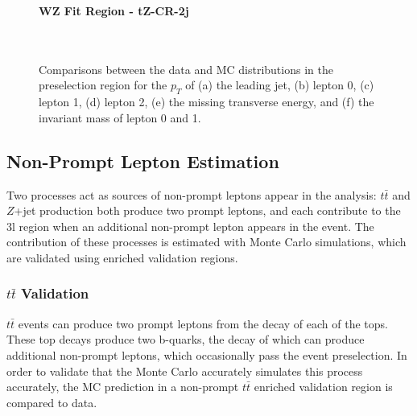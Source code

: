 \begin{figure}[H]
    \textbf{WZ Fit Region - tZ-CR-2j}\\
    \\
    \\
    \caption{Comparisons between the data and MC distributions in the preselection region for the $p_T$ of (a) the leading jet, (b) lepton 0, (c) lepton 1, (d) lepton 2, (e) the missing transverse energy, and (f) the invariant mass of lepton 0 and 1.}
    \label{kin:tZ_CR_2j}
\end{figure}

\subsection{Non-Prompt Lepton Estimation}
\label{sec:fakes}

Two processes act as sources of non-prompt leptons appear in the analysis: $t\bar{t}$ and $Z$+jet production both produce two prompt leptons, and each contribute to the 3l region when an additional non-prompt lepton appears in the event. The contribution of these processes is estimated with Monte Carlo simulations, which are validated using enriched validation regions.

\subsubsection{$t\bar{t}$ Validation}

$t\bar{t}$ events can produce two prompt leptons from the decay of each of the tops. These top decays produce two b-quarks, the decay of which can produce additional non-prompt leptons, which occasionally pass the event preselection. In order to validate that the Monte Carlo accurately simulates this process accurately, the MC prediction in a non-prompt $t\bar{t}$ enriched validation region is compared to data.

